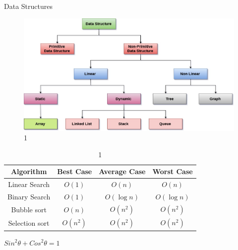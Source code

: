 \documentclass{beamer}[10pt]
\begin{document}
\begin{frame}{Data Structures}

    
\begin{figure}
    \centering
    \includegraphics[scale=0.25]{Image 1.jpeg}
    \caption{1}
    \label{fig:my_label}
\end{figure}
    
\end{frame}

\begin{frame}{}
    
    \begin{center}
        \begin{table}[t]
            \centering
            \begin{tabular}{|c|c|c|c|}
            \hline
            Algorithm  & Best Case  & Average Case & Worst Case  \\
             \hline
             \hline
             Linear Search & $O(1)$ & $O(n)$ & $O(n)$ \\
             Binary Search & $O(1)$ & $O(\log n)$ & $O(\log n)$ \\
             Bubble sort & $O(n)$ & $O(n^2)$ & $O(n^2)$ \\
             Selection sort & $O(n^2)$ & $O(n^2)$ & $O(n^2)$ \\
             \hline
            \end{tabular}
            \caption{1}
            \label{tab:table1}
        \end{table}
    \end{center}
    
    \begin{theorem} 
    $Sin ^2 \theta + Cos ^2 \theta = 1$
    \end{theorem}
    
\transboxin    

\end{frame}
\end{document}
